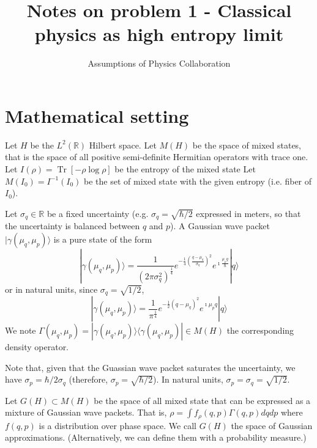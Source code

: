 \documentclass[11pt]{article}
\def\>{\rangle}
\def\<{\langle}
\DeclareMathOperator{\Tr}{Tr}
\begin{document}
	\title{Notes on problem 1 - Classical physics as high entropy limit}
	\author{Assumptions of Physics Collaboration}

	\date{}

	\maketitle

\section{Mathematical setting}

Let $H$ be the $L^2(\mathbb{R})$ Hilbert space. Let $M(H)$ be the space of mixed states, that is the space of all positive semi-definite Hermitian operators with trace one. Let $I(\rho) = \Tr [-\rho \log \rho]$ be the entropy of the mixed state Let $M(I_0) = I^{-1}(I_0)$ be the set of mixed state with the given entropy (i.e. fiber of $I_0$).

Let $\sigma_q \in \mathbb{R}$ be a fixed uncertainty (e.g. $\sigma_q = \sqrt{\hbar/2}$ expressed in meters, so that the uncertainty is balanced between $q$ and $p$). A Gaussian wave packet $|\gamma(\mu_q,\mu_p)\>$ is a pure state of the form
\begin{equation}
	|\gamma(\mu_q,\mu_p)\> = \frac{1}{(2 \pi \sigma_q^2)^{\frac{1}{4}}} e^{-\frac{1}{4} \left(\frac{q-\mu_q}{\sigma_q}\right)^2} e^{\imath \frac{\mu_p q}{\hbar}} | q \>
\end{equation}
or in natural units, since $\sigma_q = \sqrt{1/2}$,
\begin{equation}
	|\gamma(\mu_q,\mu_p)\> = \frac{1}{\pi^{\frac{1}{4}}} e^{-\frac{1}{2} \left(q-\mu_q\right)^2} e^{\imath \mu_p q} | q \>
\end{equation}
We note $\Gamma(\mu_q,\mu_p) = |\gamma(\mu_q,\mu_p)\> \<\gamma(\mu_q,\mu_p)| \in M(H)$ the corresponding density operator.

Note that, given that the Guassian wave packet saturates the uncertainty, we have $\sigma_p = \hbar / 2 \sigma_q$ (therefore, $\sigma_p = \sqrt{\hbar/2}$). In natural units, $\sigma_p = \sigma_q = \sqrt{1/2}$.

Let $G(H) \subset M(H)$ be the space of all mixed state that can be expressed as a mixture of Gaussian wave packets. That is, $\rho = \int f_\rho(q, p) \Gamma(q, p) dq dp$ where $f(q, p)$ is a distribution over phase space. We call $G(H)$ the space of Gaussian approximations. (Alternatively, we can define them with a probability measure.)
\end{document}
